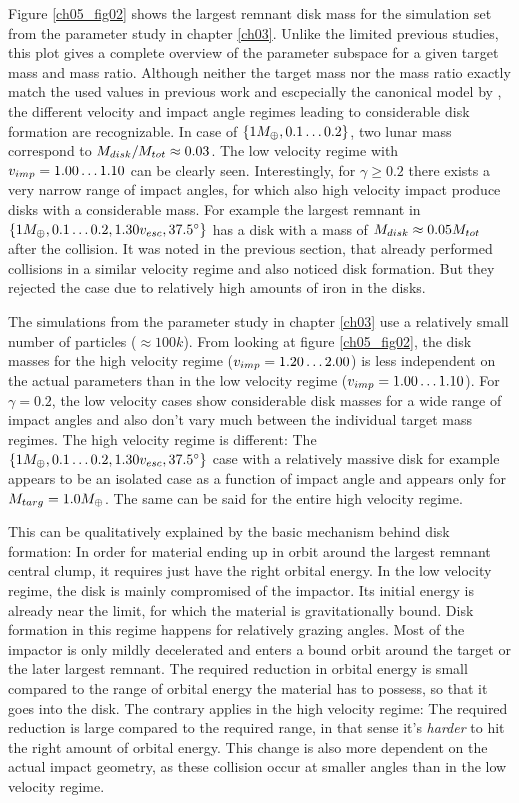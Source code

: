 Figure \ref{ch05_fig02} shows the largest remnant disk mass for the simulation set \css from the parameter study in chapter \ref{ch03}. Unlike the limited previous studies, this plot gives a complete overview of the parameter subspace for a given target mass and mass ratio. Although neither the target mass nor the mass ratio exactly match the used values in previous work and escpecially the canonical model by \cite{Canup:2001p1861}, the different velocity and impact angle regimes leading to considerable disk formation are recognizable. In case of $\{ 1 M_{\oplus}, 0.1 \dots 0.2 \}$, two lunar mass correspond to $M_{disk} / M_{tot} \approx 0.03$. The low velocity regime with $v_{imp} = 1.00 \dots 1.10$ can be clearly seen. Interestingly, for $\gamma \ge 0.2$ there exists a very narrow range of impact angles, for which also high velocity impact produce disks with a considerable mass. For example the largest remnant in $\{ 1 M_{\oplus}, 0.1 \dots 0.2, 1.30 v_{esc}, 37.5 ^\circ \}$ has a disk with a mass of $M_{disk} \approx 0.05 M_{tot}$ after the collision. It was noted in the previous section, that \cite{Benz:1989p1893} already performed collisions in a similar velocity regime and also noticed disk formation. But they rejected the case due to relatively high amounts of iron in the disks.

The simulations from the parameter study in chapter \ref{ch03} use a relatively small number of particles ($\approx 100k$). From looking at figure \ref{ch05_fig02}, the disk masses for the high velocity regime ($v_{imp} = 1.20 \dots 2.00$) is less independent on the actual parameters than in the low velocity regime ($v_{imp} = 1.00 \dots 1.10$). For $\gamma = 0.2$, the low velocity cases show considerable disk masses for a wide range of impact angles and also don't vary much between the individual target mass regimes. The high velocity regime is different: The $\{ 1 M_{\oplus}, 0.1 \dots 0.2, 1.30 v_{esc}, 37.5 ^\circ \}$ case with a relatively massive disk for example appears to be an isolated case as a function of impact angle and appears only for $M_{targ} = 1.0 M_{\oplus}$. The same can be said for the entire high velocity regime. 

This can be qualitatively explained by the basic mechanism behind disk formation: In order for material ending up in orbit around the largest remnant central clump, it requires just have the right orbital energy. In the low velocity regime, the disk is mainly compromised of the impactor. Its initial energy is already near the limit, for which the material is gravitationally bound. Disk formation in this regime happens for relatively grazing angles. Most of the impactor is only mildly decelerated and enters a bound orbit around the target or the later largest remnant. The required reduction in orbital energy is small compared to the range of orbital energy the material has to possess, so that it goes into the disk. The contrary applies in the high velocity regime: The required reduction is large compared to the required range, in that sense it's \emph{harder} to hit the right amount of orbital energy. This change is also more dependent on the actual impact geometry, as these collision occur at smaller angles than in the low velocity regime.

